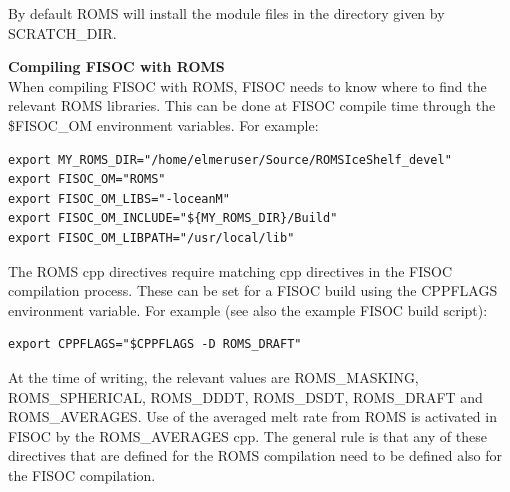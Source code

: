 \documentclass[12pt]{article}
\begin{document}
By default ROMS will install the module files in the directory given by 
 SCRATCH\_DIR.  

\vspace{10pt}
\textbf{Compiling FISOC with ROMS}\\
When compiling FISOC with ROMS, FISOC needs to know where to 
find the relevant ROMS libraries.  
This can be done at FISOC compile time through the 
\$FISOC\_OM
environment variables.  For example:

\begin{lstlisting}
export MY_ROMS_DIR="/home/elmeruser/Source/ROMSIceShelf_devel"
export FISOC_OM="ROMS"
export FISOC_OM_LIBS="-loceanM"
export FISOC_OM_INCLUDE="${MY_ROMS_DIR}/Build"
export FISOC_OM_LIBPATH="/usr/local/lib"
\end{lstlisting}

The ROMS cpp directives require matching cpp directives in the FISOC 
compilation process. 
These can be set for a FISOC build using the CPPFLAGS environment variable.
For example (see also the example FISOC build script):
\begin{lstlisting}
export CPPFLAGS="$CPPFLAGS -D ROMS_DRAFT"
\end{lstlisting}
At the time of writing, the relevant values are ROMS\_MASKING, ROMS\_SPHERICAL, 
ROMS\_DDDT, ROMS\_DSDT, ROMS\_DRAFT and ROMS\_AVERAGES. Use of the averaged melt rate from ROMS is activated in FISOC by the ROMS\_AVERAGES cpp. The general rule is that any of these directives that 
are defined for the ROMS compilation need to be defined also for the FISOC 
compilation. 







\end{document}
